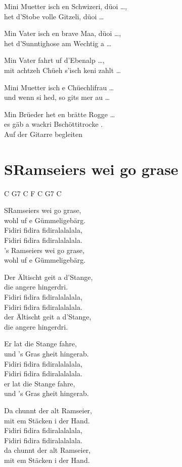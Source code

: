 \documentclass[
  letterpaper,
]{scrbook}
\begin{document}
Mini Muetter isch en Schwizeri, düoi \ldots,\\
het d'Stobe volle Gitzeli, düoi \ldots{}

Min Vater isch en brave Maa, düoi \ldots,\\
het d'Sunntighose am Wechtig a \ldots{}

Min Vater fahrt uf d'Ebenalp \ldots,\\
mit achtzeh Chüeh s'isch keni zahlt \ldots{}

Mini Muetter isch e Chüechlifrau \ldots{}\\
und wenn si hed, so git\textquotesingle s mer au \ldots{}

Min Brüeder het en brätte Rogge \ldots{}\\
es gäb a wackri Bschöttitrocke .\\
Auf der Gitarre begleiten

\hypertarget{sramseiers-wei-go-grase}{%
\chapter{S\textquotesingle Ramseiers wei go
grase}\label{sramseiers-wei-go-grase}}

C G7 C F C G7 C

S\textquotesingle Ramseiers wei go grase,\\
wohl uf e Gümmeligebärg.\\
Fidiri fidira fidiralalalala,\\
Fidiri fidira fidiralalalala.\\
's Ramseiers wei go grase,\\
wohl uf e Gümmeligebärg.

Der Ältischt geit a d'Stange,\\
die angere hingerdri.\\
Fidiri fidira fidiralalalala,\\
Fidiri fidira fidiralalalala.\\
der Ältischt geit a d'Stange,\\
die angere hingerdri.

Er lat die Stange fahre,\\
und 's Gras gheit hingerab.\\
Fidiri fidira fidiralalalala,\\
Fidiri fidira fidiralalalala.\\
er lat die Stange fahre,\\
und 's Gras gheit hingerab.

Da chunnt der alt Ramseier,\\
mit em Stäcken i der Hand.\\
Fidiri fidira fidiralalalala,\\
Fidiri fidira fidiralalalala.\\
da chunnt der alt Ramseier,\\
mit em Stäcken i der Hand.
\end{document}
